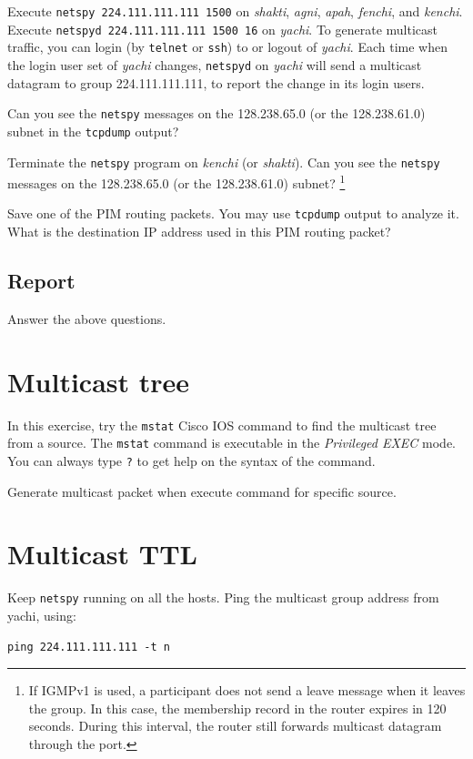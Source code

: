 \documentclass{../UTNetLab}
\begin{document}
    Execute \lstinline{netspy 224.111.111.111 1500} on \textit{shakti}, \textit{agni}, \textit{apah}, \textit{fenchi}, and \textit{kenchi}.
    Execute \lstinline{netspyd 224.111.111.111 1500 16} on \textit{yachi}.
    To generate multicast traffic, you can login (by \lstinline{telnet} or \lstinline{ssh}) to or logout of \textit{yachi}.
    Each time when the login user set of \textit{yachi} changes, \lstinline{netspyd} on \textit{yachi} will send a multicast datagram to group 224.111.111.111, to report the change in its login users.

    Can you see the \lstinline{netspy} messages on the 128.238.65.0 (or the 128.238.61.0) subnet in the \lstinline{tcpdump} output? 

    Terminate the \lstinline{netspy} program on \textit{kenchi} (or \textit{shakti}).
    Can you see the \lstinline{netspy} messages on the 128.238.65.0 (or the 128.238.61.0) subnet?
    \footnote{If IGMPv1 is used, a participant does not send a leave message when it leaves the group.
    In this case, the membership record in the router expires in 120 seconds.
    During this interval, the router still forwards multicast datagram through the port.} 

    Save one of the PIM routing packets.
    You may use \lstinline{tcpdump} output to analyze it.
    What is the destination IP address used in this PIM routing packet?
    
    \subsection*{Report}
    Answer the above questions.

\section{Multicast tree}
    In this exercise, try the \lstinline[language={cisco}]{mstat} Cisco IOS command to find the multicast tree from a source.
    The \lstinline[language={cisco}]{mstat} command is executable in the \textit{Privileged EXEC} mode.
    You can always type \lstinline[language={cisco}]{?} to get help on the syntax of the command.

    Generate multicast packet when execute command for specific source.

\section{Multicast TTL}
    Keep \lstinline{netspy} running on all the hosts.
    Ping the multicast group address from yachi, using: 
    \begin{lstlisting}[emph={n}]
ping 224.111.111.111 -t n
    \end{lstlisting}
\end{document}
